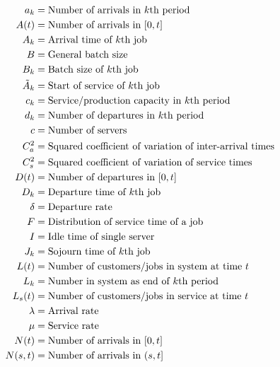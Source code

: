 


\begin{align*}
 a_k &= \text{Number of arrivals in $k$th period} \\
 A(t) &= \text{Number of arrivals in $[0,t]$} \\
 A_k &= \text{Arrival time of $k$th job} \\
 B &= \text{General batch size} \\
 B_k &= \text{Batch size  of $k$th job} \\
 \tilde A_{k} &= \text{Start of service of $k$th job} \\
 c_k &= \text{Service/production capacity in $k$th period} \\
 d_k &= \text{Number of departures in $k$th period} \\
 c &= \text{Number of servers} \\
 C_a^2 &= \text{Squared coefficient of variation of  inter-arrival times} \\
 C_s^2 &= \text{Squared coefficient of variation of  service times} \\
 D(t) &= \text{Number of departures in $[0,t]$} \\
 D_k &= \text{Departure time of $k$th job} \\
 \delta &= \text{Departure rate} \\
 F &= \text{Distribution of  service time of a job} \\
 I &= \text{Idle time of single server} \\
\J_k &= \text{Sojourn time of $k$th job} \\
 \L(t) &= \text{Number of customers/jobs in  system at time $t$} \\
 \L_k &= \text{Number in  system as  end of $k$th period} \\
 \Ls(t) &= \text{Number of customers/jobs in service at time $t$} \\
 \lambda &= \text{Arrival rate} \\
 \mu &= \text{Service rate} \\
 N(t) &= \text{Number of arrivals in $[0,t]$} \\
 N(s,t) &= \text{Number of arrivals in $(s,t]$} \\

\end{align*}
